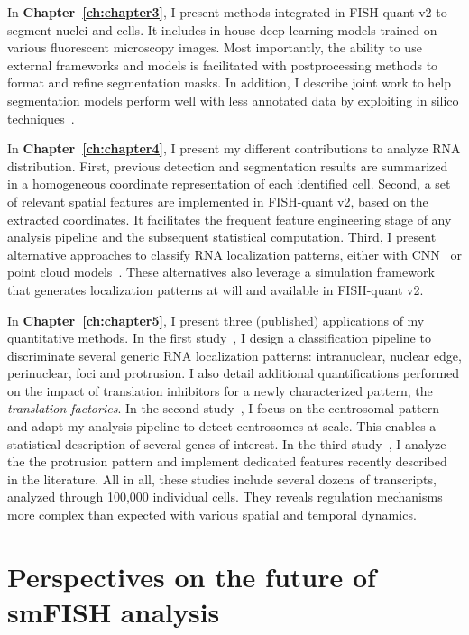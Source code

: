 In \textbf{Chapter~\ref{ch:chapter3}}, I present methods integrated in FISH-quant v2 to segment nuclei and cells.
It includes in-house deep learning models trained on various fluorescent microscopy images.
Most importantly, the ability to use external frameworks and models is facilitated with postprocessing methods to format and refine segmentation masks.
In addition, I describe joint work to help segmentation models perform well with less annotated data by exploiting in silico techniques~\cite{Bonte_2022}.

In \textbf{Chapter~\ref{ch:chapter4}}, I present my different contributions to analyze \ac{RNA} distribution.
First, previous detection and segmentation results are summarized in a homogeneous coordinate representation of each identified cell.
Second, a set of relevant spatial features are implemented in FISH-quant v2, based on the extracted coordinates.
It facilitates the frequent feature engineering stage of any analysis pipeline and the subsequent statistical computation.
Third, I present alternative approaches to classify \ac{RNA} localization patterns, either with \ac{CNN}~\cite{dubois_deep_2019} or point cloud models~\cite{pointfish_2022}.
These alternatives also leverage a simulation framework that generates localization patterns at will and available in FISH-quant v2.

In \textbf{Chapter~\ref{ch:chapter5}}, I present three (published) applications of my quantitative methods.
In the first study~\cite{CHOUAIB_2020}, I design a classification pipeline to discriminate several generic \ac{RNA} localization patterns: intranuclear, nuclear edge, perinuclear, foci and protrusion.
I also detail additional quantifications performed on the impact of translation inhibitors for a newly characterized pattern, the \emph{translation factories}.
In the second study~\cite{safieddine_choreography_2021}, I focus on the centrosomal pattern and adapt my analysis pipeline to detect centrosomes at scale.
This enables a statistical description of several genes of interest.
In the third study~\cite{pichon_kinesin_2021}, I analyze the the protrusion pattern and implement dedicated features recently described in the literature.
All in all, these studies include several dozens of transcripts, analyzed through 100,000 individual cells.
They reveals regulation mechanisms more complex than expected with various spatial and temporal dynamics.

\section{Perspectives on the future of smFISH analysis}
\label{sec:conclusion_future}

